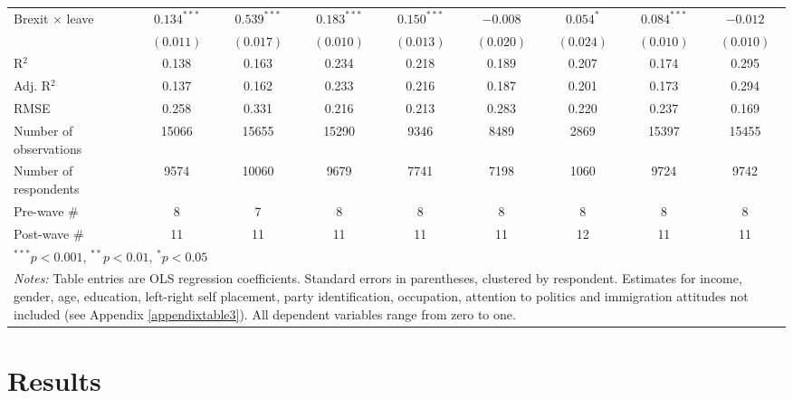 \documentclass[12pt, letter]{article}
\begin{document}
\begin{table}[t]
\begin{center}
{\begin{tabular}{l c c c c c c c c }
Brexit $\times$ leave            & $0.134^{***}$  & $0.539^{***}$  & $0.183^{***}$  & $0.150^{***}$  & $-0.008$       & $0.054^{*}$   & $0.084^{***}$  & $-0.012$       \\
                                 & $(0.011)$      & $(0.017)$      & $(0.010)$      & $(0.013)$      & $(0.020)$      & $(0.024)$     & $(0.010)$      & $(0.010)$      \\
\hline
R$^2$                            & 0.138          & 0.163          & 0.234          & 0.218          & 0.189          & 0.207         & 0.174          & 0.295          \\
Adj. R$^2$                       & 0.137          & 0.162          & 0.233          & 0.216          & 0.187          & 0.201         & 0.173          & 0.294          \\
RMSE                             & 0.258          & 0.331          & 0.216          & 0.213          & 0.283          & 0.220         & 0.237          & 0.169          \\
\hline
Number of observations           & 15066          & 15655          & 15290          & 9346           & 8489           & 2869          & 15397          & 15455          \\
Number of respondents & 9574 & 10060 & 9679 & 7741 & 7198 & 1060 & 9724 & 9742 \\ 
Pre-wave \# & 8 & 7 & 8 & 8 & 8 & 8 & 8 & 8 \\  
Post-wave \# & 11 & 11 & 11 & 11 & 11 & 12 & 11 & 11 \\ 
\toprule[1.5pt]
\multicolumn{9}{l}{\scriptsize{$^{***}p<0.001$, $^{**}p<0.01$, $^*p<0.05$}} \\
\multicolumn{9}{l}{\multirow{3}{650pt}{\footnotesize{\textit{Notes:} Table entries are OLS regression coefficients. Standard errors in parentheses, clustered by respondent. Estimates for income, gender, age, education, left-right self placement, party identification, occupation, attention to politics and immigration attitudes not included (see Appendix \ref{appendixtable3}). All dependent variables range from zero to one.}}} \\
\end{tabular}}
\end{center}
\end{table}

\section{Results}
\end{document}
